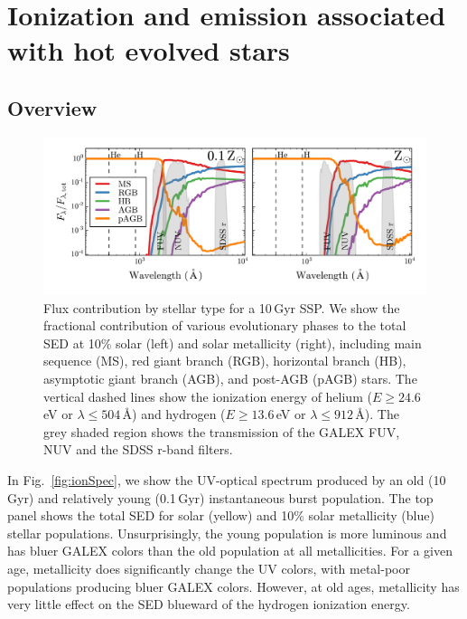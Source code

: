 \documentclass[preprint2]{aastex62}
\newcommand{\ang}{\ensuremath{\mbox{\AA}}\xspace}
\newcommand{\Gyr}{$\,$Gyr\xspace}
\begin{document}
\section{Ionization and emission associated with hot evolved stars}\label{sec:stars}
\subsection{Overview}\label{sec:stars:overview}

\begin{figure}[ht]
  \begin{center}
    \includegraphics[width=\linewidth]{figs/f2.png}
    \caption{{\sc Flux contribution by stellar type for a 10\,Gyr SSP.} We show the fractional contribution of various evolutionary phases to the total SED at 10\% solar (left) and solar metallicity (right), including main sequence (MS), red giant branch (RGB), horizontal branch (HB), asymptotic giant branch (AGB), and post-AGB (pAGB) stars. The vertical dashed lines show the ionization energy of helium ($E\geq24.6\,$eV or $\lambda \leq 504\,$\ang) and hydrogen ($E\geq13.6\,$eV or $\lambda \leq 912\,$\ang). The grey shaded region shows the transmission of the GALEX FUV, NUV and the SDSS r-band filters.}
    \label{fig:FracSpec}
  \end{center}
\end{figure}

In Fig.~\ref{fig:ionSpec}, we show the UV-optical spectrum produced by an old (10\Gyr) and relatively young (0.1\Gyr) instantaneous burst population. The top panel shows the total SED for solar (yellow) and 10\% solar metallicity (blue) stellar populations. Unsurprisingly, the young population is more luminous and has bluer GALEX colors than the old population at all metallicities. For a given age, metallicity does significantly change the UV colors, with metal-poor populations producing bluer GALEX colors. However, at old ages, metallicity has very little effect on the SED blueward of the hydrogen ionization energy.
\end{document}
